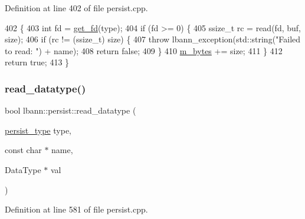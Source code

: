 Definition at line 402 of file persist.\+cpp.


\begin{DoxyCode}
402                                                                                          \{
403   \textcolor{keywordtype}{int} fd = \hyperlink{classlbann_1_1persist_a0fe7bbf6a5a47417aa904d0cb64af3fd}{get\_fd}(type);
404   \textcolor{keywordflow}{if} (fd >= 0) \{
405     ssize\_t rc = read(fd, buf, size);
406     \textcolor{keywordflow}{if} (rc != (ssize\_t) size) \{
407       \textcolor{keywordflow}{throw} lbann\_exception(std::string(\textcolor{stringliteral}{"Failed to read: "}) + name);
408       \textcolor{keywordflow}{return} \textcolor{keyword}{false};
409     \}
410     \hyperlink{classlbann_1_1persist_a0bd4fd42d9858a5210c8034dfbb666d4}{m\_bytes} += size;
411   \}
412   \textcolor{keywordflow}{return} \textcolor{keyword}{true};
413 \}
\end{DoxyCode}
\mbox{\label{classlbann_1_1persist_a1e84eff891affad6001f3c5fa803cae2}} 
\subsubsection{\texorpdfstring{read\+\_\+datatype()}{read\_datatype()}}
{\footnotesize\ttfamily bool lbann\+::persist\+::read\+\_\+datatype (\begin{DoxyParamCaption}\item[{\hyperlink{namespacelbann_adee41f31f15f3906cbdcce4a1417eb56}{persist\+\_\+type}}]{type,  }\item[{const char $\ast$}]{name,  }\item[{Data\+Type $\ast$}]{val }\end{DoxyParamCaption})}



Definition at line 581 of file persist.\+cpp.


